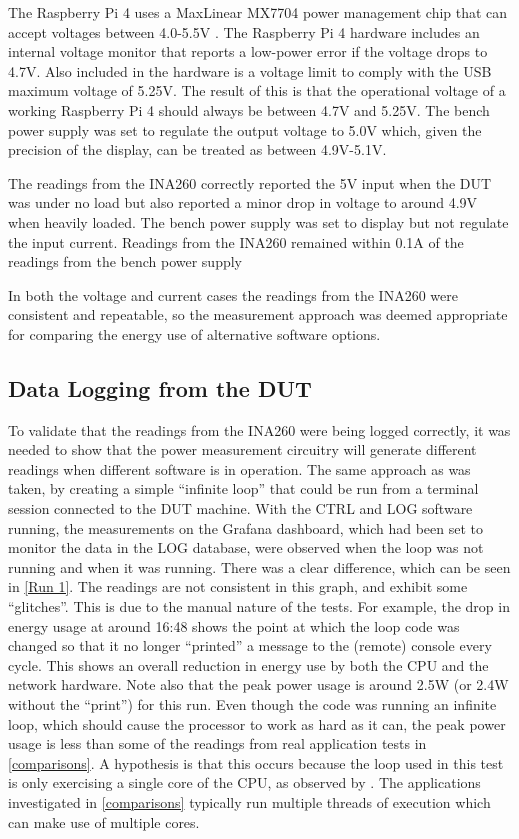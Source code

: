 The Raspberry Pi 4 uses a MaxLinear MX7704 power management chip that can accept voltages between 4.0-5.5V \citep{MaxLinear2018}. The Raspberry Pi 4 hardware includes an internal voltage monitor that reports a low-power error if the voltage drops to 4.7V. Also included in the hardware is a voltage limit to comply with the USB maximum voltage of 5.25V. The result of this is that the operational voltage of a working Raspberry Pi 4 should always be between 4.7V and 5.25V. The bench power supply was set to regulate the output voltage to 5.0V which, given the precision of the display, can be treated as between 4.9V-5.1V.

The readings from the INA260 correctly reported the 5V input when the DUT was under no load but also reported a minor drop in voltage to around 4.9V when heavily loaded. The bench power supply was set to display but not regulate the input current. Readings from the INA260 remained within 0.1A of the readings from the bench power supply

In both the voltage and current cases the readings from the INA260 were consistent and repeatable, so the measurement approach was deemed appropriate for comparing the energy use of alternative software options.

\subsection{Data Logging from the DUT}
\label{logging}

To validate that the readings from the INA260 were being logged correctly, it was needed to show that the power measurement circuitry will generate different readings when different software is in operation. The same approach as \citet{Kaup2014} was taken, by creating a simple \enquote{infinite loop} that could be run from a terminal session connected to the DUT machine. With the CTRL and LOG software running, the measurements on the Grafana dashboard, which had been set to monitor the data in the LOG database, were observed when the loop was not running and when it was running. There was a clear difference, which can be seen in \autoref{Run 1}. The readings are not consistent in this graph, and exhibit some \enquote{glitches}. This is due to the manual nature of the tests. For example, the drop in energy usage at around 16:48 shows the point at which the loop code was changed so that it no longer \enquote{printed} a message to the (remote) console every cycle. This shows an overall reduction in energy use by both the CPU and the network hardware. Note also that the peak power usage is around 2.5W (or 2.4W without the \enquote{print}) for this run. Even though the code was running an infinite loop, which should cause the processor to work as hard as it can, the peak power usage is less than some of the readings from real application tests in \autoref{comparisons}. A hypothesis is that this occurs because the loop used in this test is only exercising a single core of the CPU, as  observed by \citet{Basmadjian2012}. The applications investigated in \autoref{comparisons} typically run multiple threads of execution which can make use of multiple cores.

